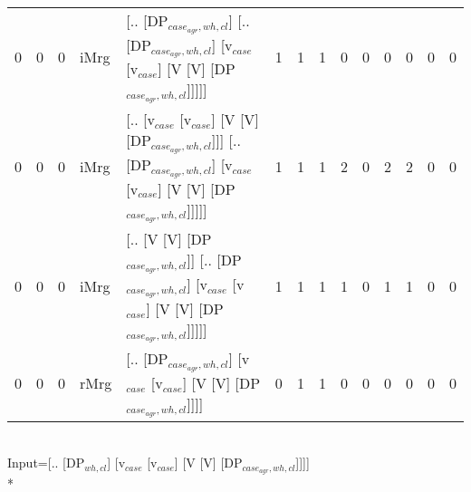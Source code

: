 \begin{tabularx}{\linewidth}{rrrlXrrrrrrrrr}
   0 &       0 &   0 & iMrg & [.. [DP$_{case_{agr},wh,cl}$] [.. [DP$_{case_{agr},wh,cl}$] [v$_{case}$ [v$_{case}$] [V [V] [DP$_{case_{agr},wh,cl}$]]]]]                           &            1 &             1 &             1 &                  0 &              0 &           0 &           0 &                0 &             0 \\
   0 &       0 &   0 & iMrg & [.. [v$_{case}$ [v$_{case}$] [V [V] [DP$_{case_{agr},wh,cl}$]]] [.. [DP$_{case_{agr},wh,cl}$] [v$_{case}$ [v$_{case}$] [V [V] [DP$_{case_{agr},wh,cl}$]]]]] &            1 &             1 &             1 &                  2 &              0 &           2 &           2 &                0 &             0 \\
   0 &       0 &   0 & iMrg & [.. [V [V] [DP$_{case_{agr},wh,cl}$]] [.. [DP$_{case_{agr},wh,cl}$] [v$_{case}$ [v$_{case}$] [V [V] [DP$_{case_{agr},wh,cl}$]]]]]                   &            1 &             1 &             1 &                  1 &              0 &           1 &           1 &                0 &             0 \\
   0 &       0 &   0 & rMrg & [.. [DP$_{case_{agr},wh,cl}$] [v$_{case}$ [v$_{case}$] [V [V] [DP$_{case_{agr},wh,cl}$]]]]                                                    &            0 &             1 &             1 &                  0 &              0 &           0 &           0 &                0 &             0 \\
\hline
\end{tabularx}\endgroup\\
\begingroup\scriptsize Input=[.. [DP$_{wh,cl}$] [v$_{case}$ [v$_{case}$] [V [V] [DP$_{case_{agr},wh,cl}$]]]]\\*
